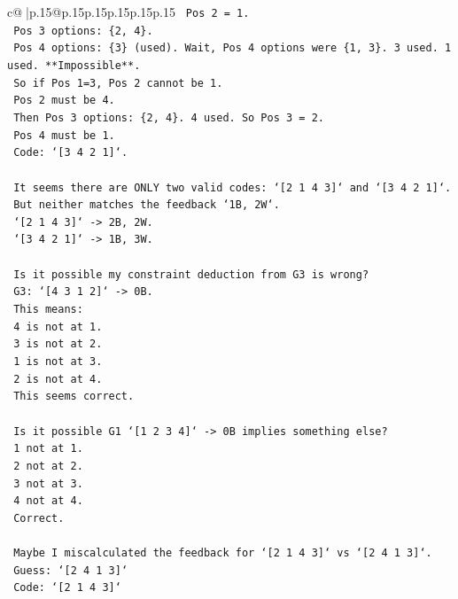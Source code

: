 \documentclass{article}
\begin{document}
{\begin{supertabular}{c@{$\;$}|p{.15\linewidth}@{}p{.15\linewidth}p{.15\linewidth}p{.15\linewidth}p{.15\linewidth}p{.15\linewidth}}
{{{\texttt{    Pos 2 = 1.} \\
\texttt{    Pos 3 options: \{2, 4\}.} \\
\texttt{    Pos 4 options: \{3\} (used). Wait, Pos 4 options were \{1, 3\}. 3 used. 1 used. **Impossible**.} \\
\texttt{    So if Pos 1=3, Pos 2 cannot be 1.} \\
\texttt{    Pos 2 must be 4.} \\
\texttt{    Then Pos 3 options: \{2, 4\}. 4 used. So Pos 3 = 2.} \\
\texttt{    Pos 4 must be 1.} \\
\texttt{    Code: `{[}3 4 2 1{]}`.} \\
\\ 
\texttt{    It seems there are ONLY two valid codes: `{[}2 1 4 3{]}` and `{[}3 4 2 1{]}`.} \\
\texttt{    But neither matches the feedback `1B, 2W`.} \\
\texttt{    `{[}2 1 4 3{]}` {-}> 2B, 2W.} \\
\texttt{    `{[}3 4 2 1{]}` {-}> 1B, 3W.} \\
\\ 
\texttt{    Is it possible my constraint deduction from G3 is wrong?} \\
\texttt{    G3: `{[}4 3 1 2{]}` {-}> 0B.} \\
\texttt{    This means:} \\
\texttt{    4 is not at 1.} \\
\texttt{    3 is not at 2.} \\
\texttt{    1 is not at 3.} \\
\texttt{    2 is not at 4.} \\
\texttt{    This seems correct.} \\
\\ 
\texttt{    Is it possible G1 `{[}1 2 3 4{]}` {-}> 0B implies something else?} \\
\texttt{    1 not at 1.} \\
\texttt{    2 not at 2.} \\
\texttt{    3 not at 3.} \\
\texttt{    4 not at 4.} \\
\texttt{    Correct.} \\
\\ 
\texttt{    Maybe I miscalculated the feedback for `{[}2 1 4 3{]}` vs `{[}2 4 1 3{]}`.} \\
\texttt{    Guess: `{[}2 4 1 3{]}`} \\
\texttt{    Code: `{[}2 1 4 3{]}`} \\
}}}
\end{supertabular}}
\end{document}
